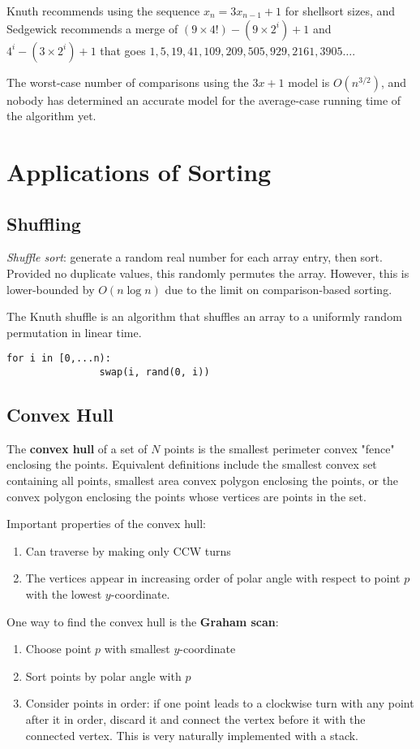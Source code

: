 \documentclass[11pt]{article}
\begin{document}
	Knuth recommends using the sequence $x_n = 3x_{n-1} + 1$ for shellsort sizes, and Sedgewick recommends a merge of $(9\times 4!) - (9\times 2^i) + 1$ and $4^i - (3\times 2^i) + 1$ that goes $1,5,19,41,109,209,505,929,2161,3905\ldots$.
	
	The worst-case number of comparisons using the $3x+1$ model is $O(n^{3/2})$, and nobody has determined an accurate model for the average-case running time of the algorithm yet.
	
\section{Applications of Sorting}
	\subsection{Shuffling}
		\textit{Shuffle sort}: generate a random real number for each array entry, then sort. Provided no duplicate values, this randomly permutes the array. However, this is lower-bounded by $O(n\log n)$ due to the limit on comparison-based sorting.
		
		The Knuth shuffle is an algorithm that shuffles an array to a uniformly random permutation in linear time.
		\begin{lstlisting}[autogobble=true]
			for i in [0,...n):
				swap(i, rand(0, i))
		\end{lstlisting}
		
	\subsection{Convex Hull}
		The \textbf{convex hull} of a set of $N$ points is the smallest perimeter convex "fence" enclosing the points. Equivalent definitions include the smallest convex set containing all points, smallest area convex polygon enclosing the points, or the convex polygon enclosing the points whose vertices are points in the set.
		
		Important properties of the convex hull:
		\begin{enumerate}
			\item Can traverse by making only CCW turns
			\item The vertices appear in increasing order of polar angle with respect to point $p$ with the lowest $y$-coordinate.
		\end{enumerate}
		
		One way to find the convex hull is the \textbf{Graham scan}:
		\begin{enumerate}
			\item Choose point $p$ with smallest $y$-coordinate
			\item Sort points by polar angle with $p$
			\item Consider points in order: if one point leads to a clockwise turn with any point after it in order, discard it and connect the vertex before it with the connected vertex. This is very naturally implemented with a stack.
		\end{enumerate}
	
\end{document}
